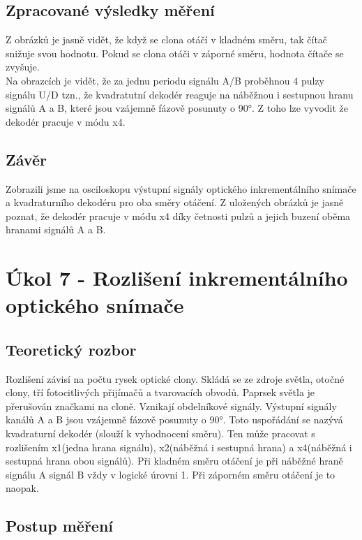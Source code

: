 \documentclass{protokol}
\begin{document}
    \clearpage
    \subsection{Zpracované výsledky měření}
    \noindent Z obrázků je jasně vidět, že když se clona otáčí v kladném směru, tak čítač snižuje svou hodnotu. Pokud se clona otáči v záporné směru, hodnota čítače se zvyšuje. \\
    \noindent Na obrazcích je vidět, že za jednu periodu signálu A/B proběhnou 4 pulzy signálu U/D tzn., že kvadratutní dekodér reaguje na náběžnou i sestupnou hranu signálů A a B, které jsou vzájemně fázově posunuty o 90°. Z toho lze vyvodit že dekodér pracuje v módu x4.

    \subsection{Závěr}
    \noindent Zobrazili jsme na osciloskopu výstupní signály optického inkrementálního snímače a kvadraturního dekodéru pro oba směry otáčení. Z uložených obrázků je jasně poznat, že dekodér pracuje v módu x4 díky četnosti pulzů a jejich buzení oběma hranami signálů A a B.

\pagebreak


\section{Úkol 7 - Rozlišení inkrementálního optického snímače}
    \subsection{Teoretický rozbor}
    \noindent Rozlišení závisí na počtu rysek optické clony. Skládá se ze zdroje světla, otočné clony, tří fotocitlivých přijímačů a tvarovacích obvodů. Paprsek světla je přerušován značkami na cloně. Vznikají obdelníkové signály. Výstupní signály kanálů A a B jsou vzájemně fázově posunuty o 90°. Toto uspořádání se nazývá kvadraturní dekodér (slouží k vyhodnocení směru). Ten může pracovat s rozlišením x1(jedna hrana signálu), x2(náběžná i sestupná hrana) a x4(náběžná i sestupná hrana obou signálů). Při kladném směru otáčení je při náběžné hraně signálu A signál B vždy v logické úrovni 1. Při záporném směru otáčení je to naopak. 


    \subsection{Postup měření}
\end{document}
